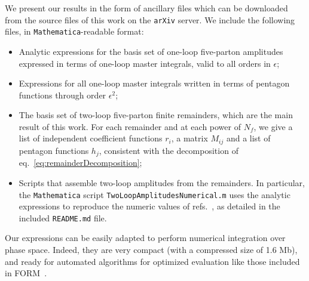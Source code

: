 We present our results in the form of ancillary files which can be downloaded
from the source files of this work on the \texttt{arXiv} server. We include the
following files, in \texttt{Mathematica}-readable format:
\begin{itemize}
    \item Analytic expressions for the basis set of one-loop five-parton amplitudes
      expressed in terms of one-loop master integrals, valid to all orders in $\epsilon$;
    \item Expressions for all one-loop master integrals written in terms of pentagon functions through order $\epsilon^2$;
    \item The basis set of two-loop five-parton finite remainders, which are the main result
of this work. For each remainder and at each power of $N_f$, we give a list of independent 
coefficient functions $r_i$, a matrix $M_{ij}$ and a list of pentagon functions $h_j$, consistent with the decomposition of eq.~\eqref{eq:remainderDecomposition};
    \item Scripts that assemble two-loop amplitudes from the remainders. 
      In particular, the \texttt{Mathematica} script \texttt{TwoLoopAmplitudesNumerical.m} uses the 
    analytic expressions to reproduce the numeric values of 
    refs.~\cite{Abreu:2018jgq,Badger:2018gip}, as detailed in the included
    \texttt{README.md} file.
\end{itemize}

Our expressions can be easily adapted to perform numerical integration over
phase space. Indeed, they are very compact (with a compressed size of 1.6 Mb),
and ready for automated algorithms for optimized
evaluation like those included in
FORM~\cite{Kuipers:2012rf,Ruijl:2014spa}.

